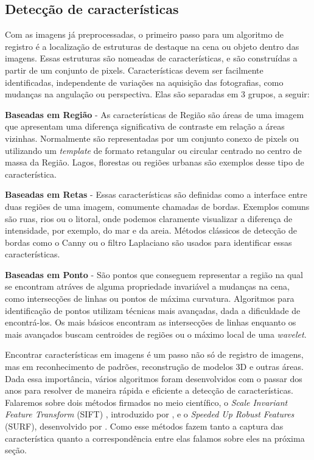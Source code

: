 \subsection{Detecção de características}
\label{sec:dec_corr_carac}

    Com as imagens já preprocessadas, o primeiro passo para um algoritmo de registro é a localização de estruturas de
destaque na cena ou objeto dentro das imagens. Essas estruturas são nomeadas de características, e são construídas a
partir de um conjunto de pixels. Características devem ser facilmente identificadas, independente de variações na
aquisição das fotografias, como mudanças na angulação ou perspectiva. Elas são separadas em 3 grupos, a seguir:

\textbf{Baseadas em Região} - As características de Região são áreas de uma imagem que apresentam uma diferença
significativa de contraste em relação a áreas vizinhas. Normalmente são representadas por um
conjunto conexo de pixels ou utilizando um \textit{template} de formato retangular ou circular centrado no centro de
massa da Região. Lagos, florestas ou regiões urbanas são exemplos desse tipo de
característica.

\textbf{Baseadas em Retas} - Essas características são definidas como a interface entre duas regiões de uma
imagem, comumente chamadas de bordas. Exemplos comuns são ruas, rios ou o litoral, onde
podemos claramente visualizar a diferença de intensidade, por exemplo, do mar e da areia. Métodos clássicos de detecção
de bordas como o Canny ou o filtro Laplaciano são usados para identificar essas características.

\textbf{Baseadas em Ponto} - São pontos que conseguem representar a região na qual se encontram atráves de alguma
propriedade invariável a mudanças na cena, como intersecções de linhas ou pontos de máxima curvatura. Algoritmos para
identificação de pontos utilizam técnicas mais avançadas, dada a dificuldade de encontrá-los. Os mais básicos encontram
as intersecções de linhas enquanto os mais avançados buscam centroides de regiões ou o máximo local de uma
\textit{wavelet}.

  Encontrar características em imagens é um passo não só de registro de imagens, mas em reconhecimento de padrões,
reconstrução de modelos 3D e outras áreas. Dada essa importância, vários algoritmos foram desenvolvidos com o passar dos
anos para resolver de maneira rápida e eficiente a detecção de características. Falaremos sobre dois métodos firmados
no meio científico, o \textit{Scale Invariant Feature Transform} (SIFT) , introduzido por \cite{lowe2004distinctive}, e
o \textit{Speeded Up Robust Features} (SURF), desenvolvido por \cite{bay2008speeded}. Como esse métodos fazem tanto a
captura das característica quanto a correspondência entre elas falamos sobre eles na próxima seção.

